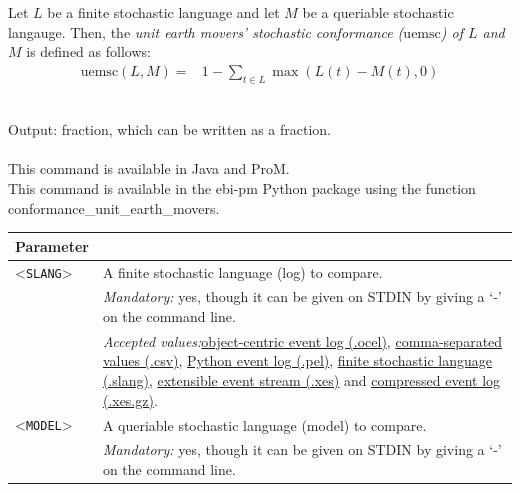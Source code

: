 {        \begin{definition}
            \label{def:uemsc}
                Let $L$ be a finite stochastic language and let $M$ be a queriable stochastic langauge.
                Then, the \emph{unit earth movers' stochastic conformance ($\text{uemsc}$) of $L$ and $M$} is defined as follows: 
                \begin{align*}
                    \text{uemsc}(L, M) ={}& 1 - \sum_{t \in L} \max(L(t) - M(t),0)
                \end{align*}       
            \end{definition}~\\
\noindent Output: fraction, which can be written as a fraction.\\
\\This command is available in Java and ProM.
\\This command is available in the ebi-pm Python package using the function conformance\_unit\_earth\_movers.
\begin{tabularx}{\linewidth}{lX}
\toprule
Parameter \\\midrule
<\texttt{SLANG}>&A finite stochastic language (log) to compare.\\
&\textit{Mandatory:} \quad yes, though it can be given on STDIN by giving a `-' on the command line.\\
&\textit{Accepted values:}\quad \hyperref[filehandler:object-centric event log]{object-centric event log (.ocel)}, \hyperref[filehandler:comma-separated values]{comma-separated values (.csv)}, \hyperref[filehandler:Python event log]{Python event log (.pel)}, \hyperref[filehandler:finite stochastic language]{finite stochastic language (.slang)}, \hyperref[filehandler:extensible event stream]{extensible event stream (.xes)} and \hyperref[filehandler:compressed event log]{compressed event log (.xes.gz)}.\\
<\texttt{MODEL}>&A queriable stochastic language (model) to compare.\\
&\textit{Mandatory:} \quad yes, though it can be given on STDIN by giving a `-' on the command line.\\

\end{tabularx}}
